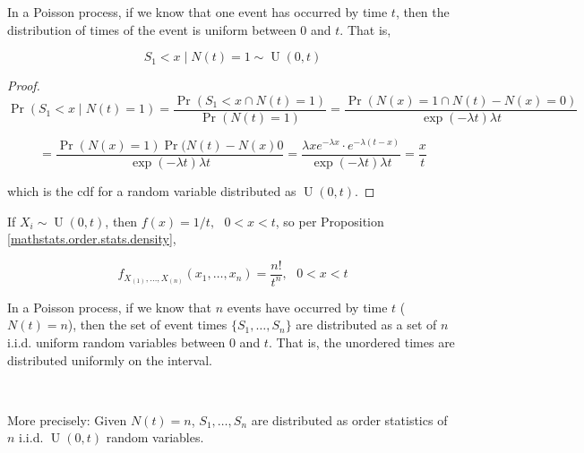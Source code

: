\begin{proposition}

In a Poisson process, if we know that one event has occurred by time \(t\), then the distribution of times of the event is uniform between 0 and \(t\). That is,

\[
S_1 < x \mid N(t) = 1 \sim \operatorname{U}(0, t)
\]

\end{proposition}

\begin{proof}
\[
\Pr(S_1 < x \mid N(t) = 1 ) = \frac{\Pr(S_1 < x \cap N(t) = 1)}{\Pr(N(t) = 1)} = \frac{\Pr(N(x) = 1 \cap N(t) - N(x) =0) }{\exp(-\lambda t) \lambda t}
\]

\[
= \frac{\Pr(N(x) = 1) \Pr( N(t) - N(x) 0 }{\exp(-\lambda t) \lambda t} =  \frac{\lambda x e^{-\lambda x} \cdot e^{-\lambda(t-x)} }{\exp(-\lambda t) \lambda t}  = \frac{x}{t}
\]

which is the cdf for a random variable distributed as \(\operatorname{U}(0, t)\).

\end{proof}

\begin{remark}

If \(X_i \sim \operatorname{U}(0, t)\), then \(f(x) = 1/t, \ \ \ 0 < x < t\), so per Proposition \ref{mathstats.order.stats.density},

\[
f_{X_{(1)}, \ldots, X_{(n)}}(x_1, \ldots, x_n) = \frac{n!}{t^n} , \ \ \ 0 < x < t
\]

\end{remark}


\begin{theorem}\label{stoch.arrivals.cond.thm} In a Poisson process, if we know that \(n\) events have occurred by time \(t\) (\(N(t) = n \)), then the set of event times \(\{S_1, \ldots, S_n\}\) are distributed as a set of \(n\) i.i.d. uniform random variables between 0 and \(t\). That is, the unordered times are distributed uniformly on the interval.

\

More precisely: Given \(N(t) = n\), \(S_1, \ldots, S_n\) are distributed as order statistics of \(n\) i.i.d. \(\operatorname{U}(0,t)\) random variables.

\end{theorem}

